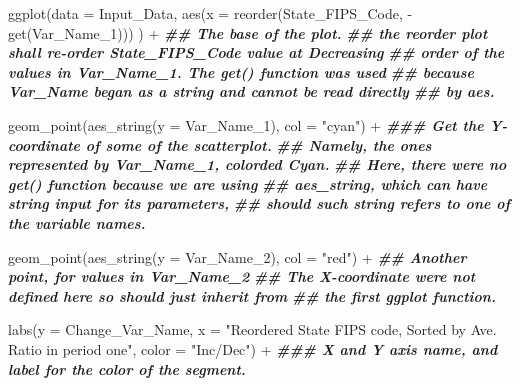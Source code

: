 \documentclass[
]{article}
\newenvironment{Shaded}{\begin{snugshade}}{\end{snugshade}}
\newcommand{\AttributeTok}[1]{\textcolor[rgb]{0.77,0.63,0.00}{#1}}
\newcommand{\DocumentationTok}[1]{\textcolor[rgb]{0.56,0.35,0.01}{\textbf{\textit{#1}}}}
\newcommand{\FunctionTok}[1]{\textcolor[rgb]{0.00,0.00,0.00}{#1}}
\newcommand{\NormalTok}[1]{#1}
\newcommand{\SpecialCharTok}[1]{\textcolor[rgb]{0.00,0.00,0.00}{#1}}
\newcommand{\StringTok}[1]{\textcolor[rgb]{0.31,0.60,0.02}{#1}}
\begin{document}
\begin{Shaded}
\begin{Highlighting}[]
  \FunctionTok{ggplot}\NormalTok{(}\AttributeTok{data =}\NormalTok{ Input\_Data,}
       \FunctionTok{aes}\NormalTok{(}\AttributeTok{x =} \FunctionTok{reorder}\NormalTok{(State\_FIPS\_Code, }\SpecialCharTok{{-}}\FunctionTok{get}\NormalTok{(Var\_Name\_1))) ) }\SpecialCharTok{+}
  \DocumentationTok{\#\# The base of the plot.}
  \DocumentationTok{\#\# the reorder plot shall re{-}order State\_FIPS\_Code value at Decreasing}
  \DocumentationTok{\#\# order of the values in Var\_Name\_1. The get() function was used}
  \DocumentationTok{\#\# because Var\_Name began as a string and cannot be read directly }
  \DocumentationTok{\#\# by aes.}
    
  \FunctionTok{geom\_point}\NormalTok{(}\FunctionTok{aes\_string}\NormalTok{(}\AttributeTok{y =}\NormalTok{ Var\_Name\_1), }\AttributeTok{col =} \StringTok{"cyan"}\NormalTok{) }\SpecialCharTok{+}
    \DocumentationTok{\#\#\# Get the Y{-}coordinate of some of the scatterplot.}
    \DocumentationTok{\#\# Namely, the ones represented by Var\_Name\_1, colorded Cyan.}
    \DocumentationTok{\#\# Here, there were no get() function because we are using}
    \DocumentationTok{\#\# aes\_string, which can have string input for its parameters,}
    \DocumentationTok{\#\# should such string refers to one of the variable names.}
    
    
  \FunctionTok{geom\_point}\NormalTok{(}\FunctionTok{aes\_string}\NormalTok{(}\AttributeTok{y =}\NormalTok{ Var\_Name\_2), }\AttributeTok{col =} \StringTok{"red"}\NormalTok{) }\SpecialCharTok{+}
    \DocumentationTok{\#\# Another point, for values in Var\_Name\_2}
    \DocumentationTok{\#\# The X{-}coordinate were not defined here so should just inherit from}
    \DocumentationTok{\#\# the first ggplot function.}
    
  \FunctionTok{labs}\NormalTok{(}\AttributeTok{y =}\NormalTok{ Change\_Var\_Name,}
       \AttributeTok{x =} \StringTok{"Reordered State FIPS code, Sorted by Ave. Ratio in period one"}\NormalTok{,}
       \AttributeTok{color =} \StringTok{"Inc/Dec"}\NormalTok{) }\SpecialCharTok{+}
    \DocumentationTok{\#\#\# X and Y axis name, and label for the color of the segment.}
    

\end{Highlighting}
\end{Shaded}
\end{document}
